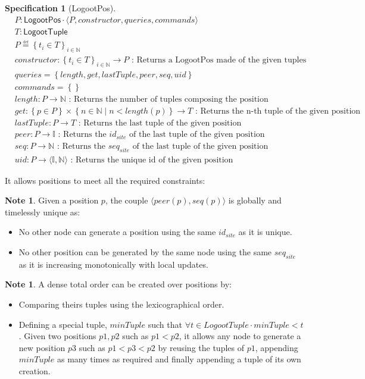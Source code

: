 \documentclass{article}
\newcommand{\commands}[1]{commands = \set{#1}}
\newcommand{\defeq}{\overset{\underset{\mathrm{def}}{}}{=}}
\newcommand{\fnspec}[3]{#1: #2 \text{ : #3}}
\newcommand{\inbb}[1]{\in \mathbb{#1}}
\newcommand{\mathlist}[2]{\set{#1_i \in #2}_{i \inbb{N}}}
\newcommand{\queries}[1]{queries = \set{#1}}
\newcommand{\set}[1]{\left\{#1\right\}} %
\newcommand{\spectuple}[1]{\tuple{#1, constructor, queries, commands}}
\newcommand{\ssep}{\mid} %
\newcommand{\tuple}[1]{\langle #1 \rangle}
\theoremstyle{definition}
\newcounter{note-counter}
\theoremstyle{definition}
\newtheorem{note}[note-counter]{Note}
\theoremstyle{definition}
\newcounter{specificationcounter}
\theoremstyle{definition}
\newtheorem{specification}[specificationcounter]{Specification}
\begin{document}
\begin{specification}[LogootPos]
    \begin{align*}
    &P: \mathsf{LogootPos} \cdot \spectuple{P}\\
    &T: \mathsf{LogootTuple}\\
    &P \defeq \mathlist{t}{T}\\
    &\fnspec{constructor}{\mathlist{t}{T} \to P}{Returns a LogootPos made of the given tuples}\\
    &\queries{length, get, lastTuple, peer, seq, uid}\\
    &\commands{}\\
    &\fnspec{length}{P \to \mathbb{N}}{Returns the number of tuples composing the position}\\
    &\fnspec{get}{\set{p \in P} \times \set{n \inbb{N} \ssep n < length(p)} \to T}{Returns the n-th tuple of the given position}\\
    &\fnspec{lastTuple}{P \to T}{Returns the last tuple of the given position}\\
    &\fnspec{peer}{P \to \mathbb{I}}{Returns the $id_{site}$ of the last tuple of the given position}\\
    &\fnspec{seq}{P \to \mathbb{N}}{Returns the $seq_{site}$ of the last tuple of the given position}\\
    &\fnspec{uid}{P \to \tuple{\mathbb{I}, \mathbb{N}}}{Returns the unique id of the given position}
    \end{align*}
    \label{spec:logoot-pos}
\end{specification}

It allows positions to meet all the required constraints:
\begin{note}
    Given a position $p$, the couple $\tuple{peer(p), seq(p)}$ is globally and timelessly unique as:
    \begin{itemize}
        \item No other node can generate a position using the same $id_{site}$ as it is unique.
        \item No other position can be generated by the same node using the same $seq_{site}$ as it is increasing monotonically with local updates.
    \end{itemize}
\end{note}

\begin{note}
    A dense total order can be created over positions by:
    \begin{itemize}
        \item Comparing theirs tuples using the lexicographical order.
        \item Defining a special tuple, $minTuple$ such that $\forall t \in LogootTuple \cdot minTuple < t$.
        Given two positions $p1, p2$ such as $p1 < p2$, it allows any node to generate a new position $p3$ such as $p1 < p3 < p2$ by reusing the tuples of $p1$, appending $minTuple$ as many times as required and finally appending a tuple of its own creation.
    \end{itemize}
\end{note}
\end{document}
